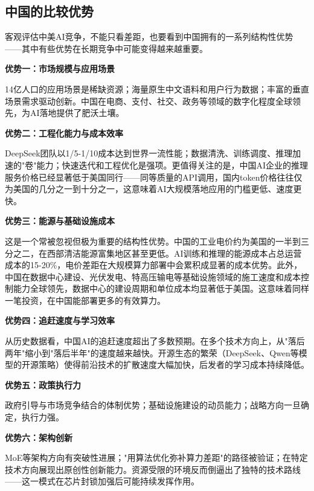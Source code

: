 \addtocounter{footnote}{-2}

\subsection{中国的比较优势}

客观评估中美AI竞争，不能只看差距，也要看到中国拥有的一系列结构性优势——其中有些优势在长期竞争中可能变得越来越重要。

\textbf{优势一：市场规模与应用场景}

14亿人口的应用场景是稀缺资源；海量原生中文语料和用户行为数据；丰富的垂直场景需求驱动创新。中国在电商、支付、社交、政务等领域的数字化程度全球领先，为AI落地提供了肥沃土壤。

\textbf{优势二：工程化能力与成本效率}

DeepSeek团队以1/5-1/10成本达到世界一流性能；数据清洗、训练调度、推理加速的"卷"能力；快速迭代和工程优化是强项。更值得关注的是，中国AI企业的推理服务价格已经显著低于美国同行——同等质量的API调用，国内token价格往往仅为美国的几分之一到十分之一，这意味着AI大规模落地应用的门槛更低、速度更快。

\textbf{优势三：能源与基础设施成本}

这是一个常被忽视但极为重要的结构性优势。中国的工业电价约为美国的一半到三分之二，在西部清洁能源富集地区甚至更低。AI训练和推理的能源成本占总运营成本的15-20\%，电价差距在大规模算力部署中会累积成显著的成本优势。此外，中国在数据中心建设、光伏发电、特高压输电等基础设施领域的施工速度和成本控制能力全球领先，数据中心的建设周期和单位成本均显著低于美国。这意味着同样一笔投资，在中国能部署更多的有效算力。

\textbf{优势四：追赶速度与学习效率}

从历史数据看，中国AI的追赶速度超出了多数预期。在多个技术方向上，从"落后两年"缩小到"落后半年"的速度越来越快。开源生态的繁荣（DeepSeek、Qwen等模型的开源策略）使得前沿技术的扩散速度大幅加快，后发者的学习成本持续降低。

\textbf{优势五：政策执行力}

政府引导与市场竞争结合的体制优势；基础设施建设的动员能力；战略方向一旦确定，执行力强。

\textbf{优势六：架构创新}

MoE等架构方向有突破性进展；"用算法优化弥补算力差距"的路径被验证；在特定技术方向展现出原创性创新能力。资源受限的环境反而倒逼出了独特的技术路线——这一模式在芯片封锁加强后可能持续发挥作用。

